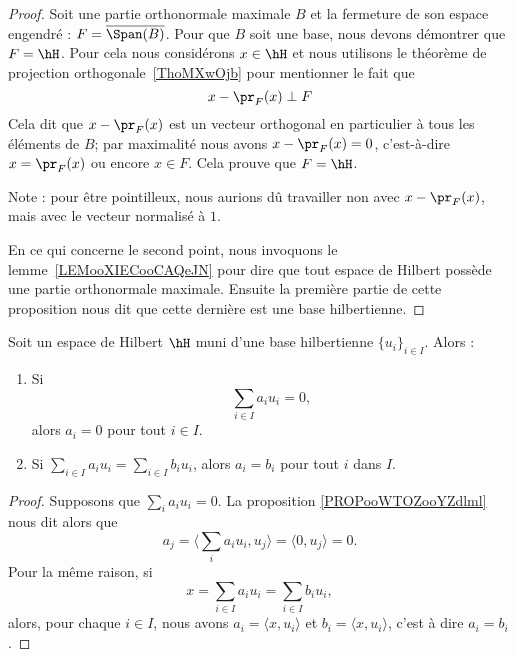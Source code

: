 \begin{proof}
	Soit une partie orthonormale maximale \( B\) et la fermeture de son espace engendré : \( F=\overline{ \Span(B) }\). Pour que \( B\) soit une base, nous devons démontrer que \( F=\hH\). Pour cela nous considérons \( x\in \hH\) et nous utilisons le théorème de projection orthogonale~\ref{ThoMXwOjb} pour mentionner le fait que
	\begin{equation}
		x-\pr_F(x)\perp F
	\end{equation}
	Cela dit que \( x-\pr_F(x)\) est un vecteur orthogonal en particulier à tous les éléments de \( B\); par maximalité nous avons \( x-\pr_F(x)=0\), c'est-à-dire \( x=\pr_F(x)\) ou encore \( x\in F\). Cela prouve que \( F=\hH\).

	Note : pour être pointilleux, nous aurions dû travailler non avec \( x-\pr_F(x)\), mais avec le vecteur normalisé à \( 1\).

	En ce qui concerne le second point, nous invoquons le lemme~\ref{LEMooXIECooCAQeJN} pour dire que tout espace de Hilbert possède une partie orthonormale maximale. Ensuite la première partie de cette proposition nous dit que cette dernière est une base hilbertienne.
\end{proof}

\begin{proposition}        \label{PROPooEYRSooCRPjdK}
	Soit un espace de Hilbert \( \hH\) muni d'une base hilbertienne \( \{ u_i \}_{i\in I}\). Alors :
	\begin{enumerate}
		\item
		      Si
		      \begin{equation}
			      \sum_{i\in I}a_iu_i=0,
		      \end{equation}
		      alors \( a_i=0\) pour tout \( i\in I\).
		\item
		      Si \( \sum_{i\in I}a_iu_i=\sum_{i\in I}b_iu_i\), alors \( a_i=b_i\) pour tout \( i\) dans \( I\).
	\end{enumerate}
\end{proposition}

\begin{proof}
	Supposons que \( \sum_ia_iu_i=0\). La proposition \ref{PROPooWTOZooYZdlml} nous dit alors que
	\begin{equation}
		a_j=\langle \sum_ia_iu_i, u_j\rangle =\langle 0, u_j\rangle =0.
	\end{equation}
	Pour la même raison, si
	\begin{equation}
		x=\sum_{i\in I}a_iu_i=\sum_{i\in I}b_iu_i,
	\end{equation}
	alors, pour chaque \( i\in I\), nous avons \( a_i=\langle x, u_i\rangle \) et \( b_i=\langle x, u_i\rangle \), c'est à dire \( a_i=b_i\).
\end{proof}

